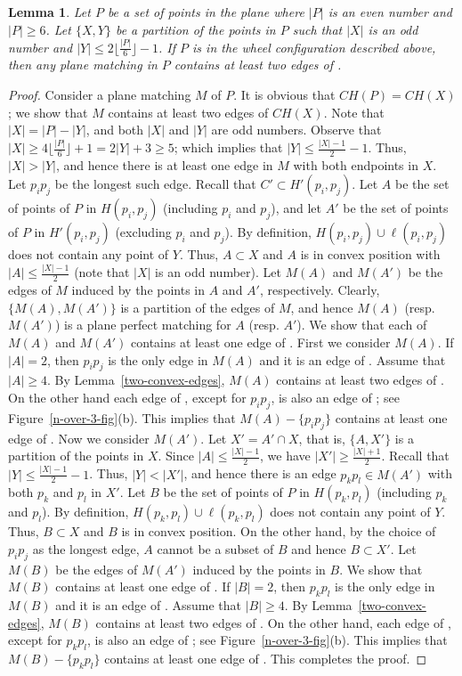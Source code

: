 \documentclass[11pt,a4paper]{article}
\newcommand{\CH}[1]{\text{$CH(#1)$}}
\newtheorem{lemma}{Lemma}
\begin{document}
\begin{lemma}
\label{two-wheel-edges}
 Let $P$ be a set of points in the plane where $|P|$ is an even number and $|P|\ge 6$. Let $\{X,Y\}$ be a partition of the points in $P$  such that $|X|$ is an odd number and $|Y|\le 2\lfloor\frac{|P|}{6}\rfloor-1$. If $P$ is in the wheel configuration described above, then any plane matching in $P$ contains at least two edges of \CH{P}.
\end{lemma}
\begin{proof}
 Consider a plane matching $M$ of $P$. It is obvious that $\CH{P}=\CH{X}$; we show that $M$ contains at least two edges of $\CH{X}$. Note that $|X|=|P|-|Y|$, and both $|X|$ and $|Y|$ are odd numbers. Observe that $|X|\ge 4\lfloor\frac{|P|}{6}\rfloor+1=2|Y|+3\ge 5$; which implies that $|Y|\le \frac{|X|-1}{2}-1$. Thus, $|X|>|Y|$, and hence there is at least one edge in $M$ with both endpoints in $X$. Let $p_ip_j$ be the longest such edge. Recall that $C'\subset H'(p_i,p_j)$. Let $A$ be the set of points of $P$ in $H(p_i,p_j)$ (including $p_i$ and $p_j$), and let $A'$ be the set of points of $P$ in $H'(p_i,p_j)$ (excluding $p_i$ and $p_j$). By definition, $H(p_i,p_j)\cup \ell(p_i,p_j)$ does not contain any point of $Y$. Thus, $A\subset X$ and $A$ is in convex position with $|A|\le \frac{|X|-1}{2}$ (note that $|X|$ is an odd number). Let $M(A)$ and $M(A')$ be the edges of $M$ induced by the points in $A$ and $A'$, respectively. Clearly, $\{M(A),M(A')\}$ is a partition of the edges of $M$, and hence $M(A)$ (resp. $M(A')$) is a plane perfect matching for $A$ (resp. $A'$). We show that each of $M(A)$ and $M(A')$ contains at least one edge of \CH{X}. First we consider $M(A)$. If $|A|=2$, then $p_ip_j$ is the only edge in $M(A)$ and it is an edge of \CH{X}. Assume that $|A|\ge 4$. By Lemma~\ref{two-convex-edges}, $M(A)$ contains at least two edges of \CH{A}. On the other hand each edge of \CH{A}, except for $p_ip_j$, is also an edge of \CH{X}; see Figure~\ref{n-over-3-fig}(b). This implies that $M(A)-\{p_ip_j\}$ contains at least one edge of \CH{X}. Now we consider $M(A')$. Let $X'=A'\cap X$, that is, $\{A,X'\}$ is a partition of the points in $X$. Since $|A|\le \frac{|X|-1}{2}$, we have $|X'|\ge\frac{|X|+1}{2}$. Recall that $|Y|\le \frac{|X|-1}{2}-1$. Thus, $|Y|<|X'|$, and hence there is an edge $p_kp_l\in M(A')$ with both $p_k$ and $p_l$ in $X'$. Let $B$ be the set of points of $P$ in $H(p_k,p_l)$ (including $p_k$ and $p_l$). By definition, $H(p_k,p_l)\cup \ell(p_k,p_l)$ does not contain any point of $Y$. Thus, $B\subset X$ and $B$ is in convex position. On the other hand, by the choice of $p_ip_j$ as the longest edge, $A$ cannot be a subset of $B$ and hence $B\subset X'$. Let $M(B)$  be the edges of $M(A')$ induced by the points in $B$. We show that $M(B)$ contains at least one edge of \CH{X}. If $|B|=2$, then $p_kp_l$ is the only edge in $M(B)$ and it is an edge of \CH{X}. Assume that $|B|\ge 4$. By Lemma~\ref{two-convex-edges}, $M(B)$ contains at least two edges of \CH{B}. On the other hand, each edge of \CH{B}, except for $p_kp_l$, is also an edge of \CH{X}; see Figure~\ref{n-over-3-fig}(b). This implies that $M(B)-\{p_kp_l\}$ contains at least one edge of \CH{X}. This completes the proof. 
\end{proof}
\end{document}

